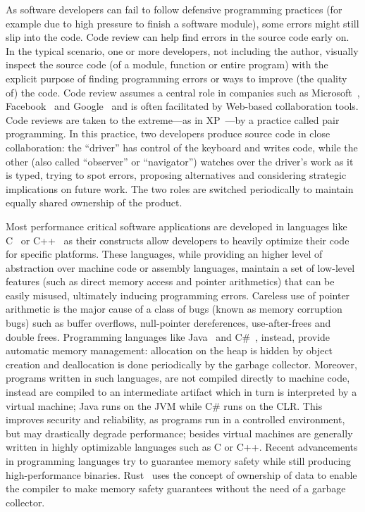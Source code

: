 As software developers can fail to follow defensive programming practices (for
example due to high pressure to finish a software module), some errors might
still slip into the code. Code review can help find errors in the source code
early on. In the typical scenario, one or more developers, not including the
author, visually inspect the source code (of a module, function or entire
program) with the explicit purpose of finding programming errors or ways to
improve (the quality of) the code. Code review assumes a central role in
companies such as Microsoft~\cite{bacchelli2013expectations},
Facebook~\cite{feitelson2013development} and Google~\cite{kennedy2006google} and
is often facilitated by Web-based collaboration tools. Code reviews are taken to
the extreme---as in \ac{XP}~\cite{Beck2004EPE}---by a practice called pair
programming. In this practice, two developers produce source code in close
collaboration: the ``driver'' has control of the keyboard and writes code, while
the other (also called ``observer'' or ``navigator'') watches over the driver's
work as it is typed, trying to spot errors, proposing alternatives and
considering strategic implications on future work. The two roles are switched
periodically to maintain equally shared ownership of the product.

Most performance critical software applications are developed in languages like
C~\cite{Kernighan1988CPL} or C++~\cite{Stroustrup2013CPL} as their constructs
allow developers to heavily optimize their code for specific platforms. These
languages, while providing an higher level of abstraction over machine code or
assembly languages, maintain a set of low-level features (such as direct memory
access and pointer arithmetics) that can be easily misused, ultimately inducing
programming errors. Careless use of pointer arithmetic is the major cause of a
class of bugs (known as memory corruption bugs) such as buffer overflows,
null-pointer dereferences, use-after-frees and double frees. Programming
languages like Java~\cite{Gosling2014JLS} and C\#~\cite{Hejlsberg2003CLS},
instead, provide automatic memory management: allocation on the heap is hidden
by object creation and deallocation is done periodically by the garbage
collector. Moreover, programs written in such languages, are not compiled
directly to machine code, instead are compiled to an intermediate artifact which
in turn is interpreted by a virtual machine; Java runs on the \ac{JVM} while C\#
runs on the \ac{CLR}. This improves security and reliability, as programs run in
a controlled environment, but may drastically degrade performance; besides
virtual machines are generally written in highly optimizable languages such as C
or C++. Recent advancements in programming languages try to guarantee memory
safety while still producing high-performance binaries.
Rust~\cite{Matsakis2014RL} uses the concept of ownership of data to enable the
compiler to make memory safety guarantees without the need of a garbage
collector.

